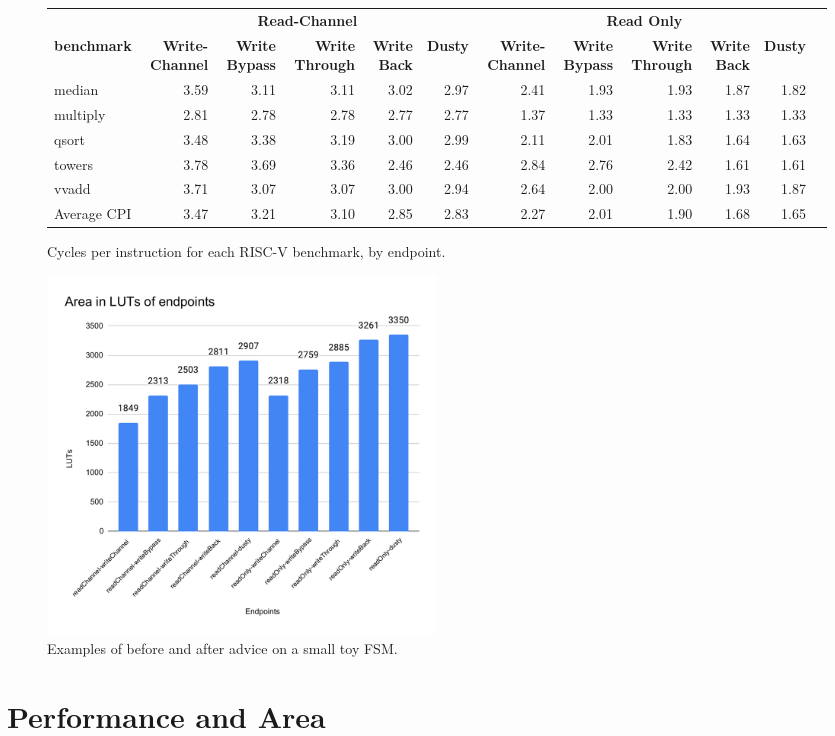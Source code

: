 \documentclass[conference]{IEEEtran}
\begin{document}
\begin{figure}[ht]
    \centering
\scriptsize
\begin{tabular}{lrrrrr|rrrrrr}\toprule
\textbf{} &\multicolumn{5}{c}{\textbf{Read-Channel}} &\multicolumn{5}{c}{\textbf{Read Only}} \\\cmidrule{2-11}
\textbf{benchmark} &\textbf{Write-Channel} &\textbf{Write Bypass} &\textbf{Write Through} &\textbf{Write Back} &\textbf{Dusty} &\textbf{Write-Channel} &\textbf{Write Bypass} &\textbf{Write Through} &\textbf{Write Back} &\textbf{Dusty} \\\midrule
median &3.59 &3.11 &3.11 &3.02 &2.97 &2.41 &1.93 &1.93 &1.87 &1.82 \\
multiply &2.81 &2.78 &2.78 &2.77 &2.77 &1.37 &1.33 &1.33 &1.33 &1.33 \\
qsort &3.48 &3.38 &3.19 &3.00 &2.99 &2.11 &2.01 &1.83 &1.64 &1.63 \\
towers &3.78 &3.69 &3.36 &2.46 &2.46 &2.84 &2.76 &2.42 &1.61 &1.61 \\
vvadd &3.71 &3.07 &3.07 &3.00 &2.94 &2.64 &2.00 &2.00 &1.93 &1.87 \\\midrule
Average CPI &3.47 &3.21 &3.10 &2.85 &2.83 &2.27 &2.01 &1.90 &1.68 &1.65 \\
\bottomrule
\end{tabular}
    \caption{Cycles per instruction for each RISC-V benchmark, by endpoint.}
    \label{fig:CPI}
\end{figure}

\begin{figure}[ht]
    \centering
    \includegraphics[width=0.5\textwidth]{isca2023-latex-template/figures/Area in LUTs of endpoints.pdf}
    \caption{Examples of before and after advice on a small toy FSM.}
    \label{fig:area}
\end{figure}

\section{Performance and Area}
\end{document}
